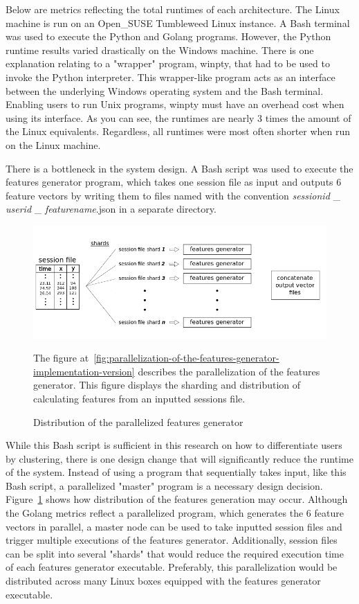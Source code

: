 Below are metrics reflecting the total runtimes of each architecture. The Linux machine is run on an Open{\_}SUSE Tumbleweed Linux instance. A Bash terminal was used to execute the Python and Golang programs. However, the Python runtime results varied drastically on the Windows machine. There is one explanation relating to a "wrapper" program, winpty, that had to be used to invoke the Python interpreter. This wrapper-like program acts as an interface between the underlying Windows operating system and the Bash terminal. Enabling users to run Unix programs, winpty must have an overhead cost when using its interface. As you can see, the runtimes are nearly 3 times the amount of the Linux equivalents. Regardless, all runtimes were most often shorter when run on the Linux machine.

There is a bottleneck in the system design. A Bash script was used to execute the features generator program, which takes one session file as input and outputs 6 feature vectors by writing them to files named with the convention \textit{sessionid} {\_} \textit{userid} {\_} \textit{featurename}.json in a separate directory.

\begin{figure}[!h]
    \includegraphics[width=1\columnwidth]{figures/parallelized_features_generator_distributed}
    \caption{Distribution of the parallelized features generator}
    \label{fig:distribution-of-the-parallelize-features-generator}
    {\small The figure at~\ref{fig:parallelization-of-the-features-generator-implementation-version} describes the parallelization of the features generator. This figure displays the sharding and distribution of calculating features from an inputted sessions file.}
\end{figure}

While this Bash script is sufficient in this research on how to differentiate users by clustering, there is one design change that will significantly reduce the runtime of the system. Instead of using a program that sequentially takes input, like this Bash script, a parallelized "master" program is a necessary design decision. Figure~\ref{fig:distribution-of-the-parallelize-features-generator} shows how distribution of the features generation may occur. Although the Golang metrics reflect a parallelized program, which generates the 6 feature vectors in parallel, a master node can be used to take inputted session files and trigger multiple executions of the features generator. Additionally, session files can be split into several "shards" that would reduce the required execution time of each features generator executable. Preferably, this parallelization would be distributed across many Linux boxes equipped with the features generator executable.

